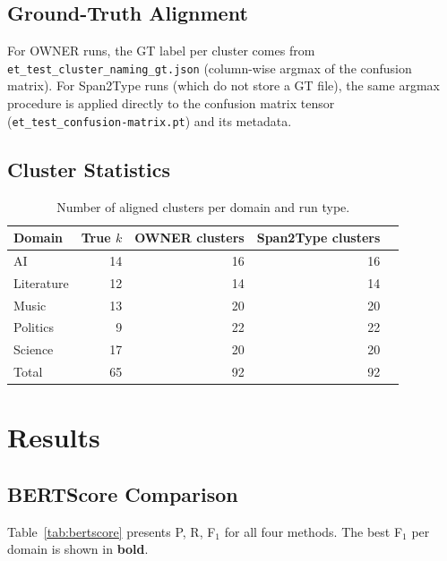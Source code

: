 \documentclass[11pt,a4paper]{article}
\begin{document}
\subsection{Ground-Truth Alignment}

For OWNER runs, the GT label per cluster comes from
\texttt{et\_test\_cluster\_naming\_gt.json} (column-wise argmax of the
confusion matrix). For Span2Type runs (which do not store a GT file),
the same argmax procedure is applied directly to the confusion matrix
tensor (\texttt{et\_test\_confusion-matrix.pt}) and its metadata.

\subsection{Cluster Statistics}

\begin{table}[h]
\centering
\caption{Number of aligned clusters per domain and run type.}
\label{tab:clusters}
\setlength{\tabcolsep}{8pt}
\begin{tabular}{l r r r r}
\toprule
\textbf{Domain} & \textbf{True $k$} & \textbf{OWNER clusters} & \textbf{Span2Type clusters} \\
\midrule
AI         & 14 & 16 & 16 \\
Literature & 12 & 14 & 14 \\
Music      & 13 & 20 & 20 \\
Politics   &  9 & 22 & 22 \\
Science    & 17 & 20 & 20 \\
\midrule
Total      & 65 & 92 & 92 \\
\bottomrule
\end{tabular}
\end{table}

\section{Results}

\subsection{BERTScore Comparison}

Table~\ref{tab:bertscore} presents P, R, F$_1$ for all four methods.
The best F$_1$ per domain is shown in \textbf{bold}.
\end{document}

